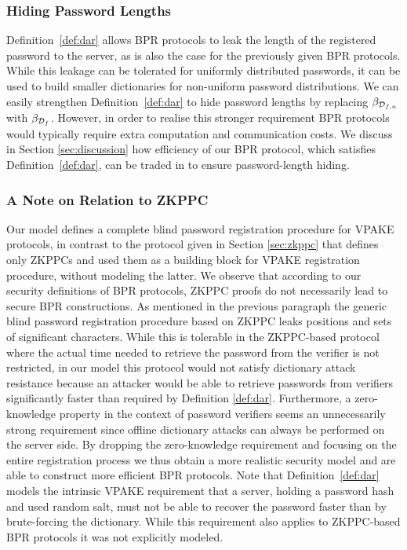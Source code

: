 \subsubsection{Hiding Password Lengths}\label{sec:strongerDAR}
Definition~\ref{def:dar} allows \ac{BPR} protocols to leak the length of the registered password to the server, as is also the case for the previously given \ac{BPR} protocols. 
While this leakage can be tolerated for uniformly distributed passwords, it can be used to build smaller dictionaries for non-uniform password distributions. 
We can easily strengthen Definition~\ref{def:dar} to hide password lengths by replacing $\beta_{\mathcal{D}_{f,n}}$ with $\beta_{\mathcal{D}_f}$. 
However, in order to realise this stronger requirement \ac{BPR} protocols would typically require extra computation and communication costs. 
We discuss in Section \ref{sec:discussion} how efficiency of our \ac{BPR} protocol, which satisfies Definition~\ref{def:dar}, can be traded in to ensure password-length hiding.

\subsubsection{A Note on Relation to ZKPPC}
Our model defines a complete blind password registration procedure for \ac{VPAKE} protocols, in contrast to the protocol given in Section \ref{sec:zkppc} that defines only \acp{ZKPPC} and used them as a building block for \ac{VPAKE} registration procedure, without modeling the latter. 
We observe that according to our security definitions of \ac{BPR} protocols, \ac{ZKPPC} proofs do not necessarily lead to secure \ac{BPR} constructions. 
As mentioned in the previous paragraph the generic blind password registration procedure based on \ac{ZKPPC} leaks positions and sets of significant characters. 
While this is tolerable in the \ac{ZKPPC}-based protocol where the actual time needed to retrieve the password from the verifier is not restricted, in our model this protocol would not satisfy dictionary attack resistance because an attacker would be able to retrieve passwords from verifiers significantly faster than required by Definition \ref{def:dar}.
Furthermore, a zero-knowledge property in the context of password verifiers seems an unnecessarily strong requirement since offline dictionary attacks can always be performed on the server side.
By dropping the zero-knowledge requirement and focusing on the entire registration process we thus obtain a more realistic security model and are able to construct more efficient \ac{BPR} protocols.
Note that Definition~\ref{def:dar} models the intrinsic \ac{VPAKE} requirement that a server, holding a password hash and used random salt, must not be able to recover the password faster than by brute-forcing the dictionary. 
While this requirement also applies to \ac{ZKPPC}-based \ac{BPR} protocols it was not explicitly modeled.


